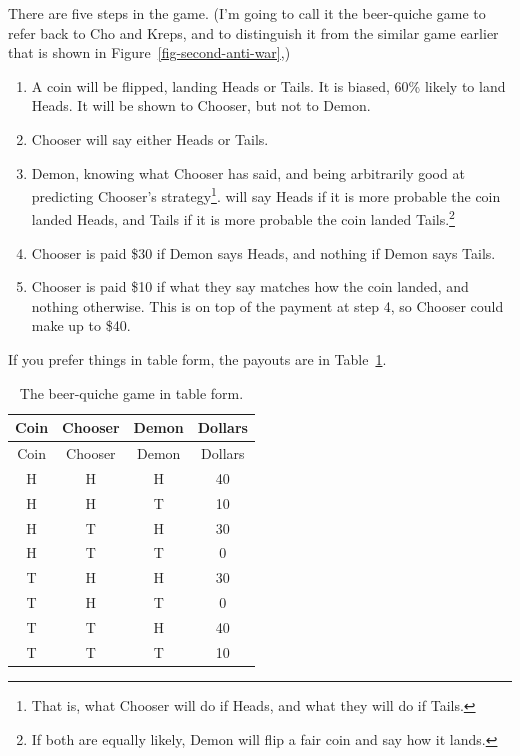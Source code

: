 \documentclass[
  12pt,
  letterpaper,
  DIV=11,
  numbers=noendperiod]{scrreprt}
\providecommand{\tightlist}{%
  \setlength{\itemsep}{0pt}\setlength{\parskip}{0pt}}\usepackage{longtable,booktabs,array}
\begin{document}
There are five steps in the game. (I'm going to call it the beer-quiche
game to refer back to Cho and Kreps, and to distinguish it from the
similar game earlier that is shown in Figure~\ref{fig-second-anti-war},)

\begin{enumerate}
\def\labelenumi{\arabic{enumi}.}
\tightlist
\item
  A coin will be flipped, landing Heads or Tails. It is biased, 60\%
  likely to land Heads. It will be shown to Chooser, but not to Demon.
\item
  Chooser will say either Heads or Tails.
\item
  Demon, knowing what Chooser has said, and being arbitrarily good at
  predicting Chooser's strategy\footnote{That is, what Chooser will do
    if Heads, and what they will do if Tails.}. will say Heads if it is
  more probable the coin landed Heads, and Tails if it is more probable
  the coin landed Tails.\footnote{If both are equally likely, Demon will
    flip a fair coin and say how it lands.}
\item
  Chooser is paid \$30 if Demon says Heads, and nothing if Demon says
  Tails.
\item
  Chooser is paid \$10 if what they say matches how the coin landed, and
  nothing otherwise. This is on top of the payment at step 4, so Chooser
  could make up to \$40.
\end{enumerate}

If you prefer things in table form, the payouts are in
Table~\ref{tbl-cho-kreps}.

\hypertarget{tbl-cho-kreps}{}
\begin{longtable}[]{@{}cccc@{}}
\caption{\label{tbl-cho-kreps}The beer-quiche game in table
form.}\tabularnewline
\toprule\noalign{}
Coin & Chooser & Demon & Dollars \\
\midrule\noalign{}
\endfirsthead
\toprule\noalign{}
Coin & Chooser & Demon & Dollars \\
\midrule\noalign{}
\endhead
\bottomrule\noalign{}
\endlastfoot
H & H & H & 40 \\
H & H & T & 10 \\
H & T & H & 30 \\
H & T & T & 0 \\
T & H & H & 30 \\
T & H & T & 0 \\
T & T & H & 40 \\
T & T & T & 10 \\
\end{longtable}
\end{document}
